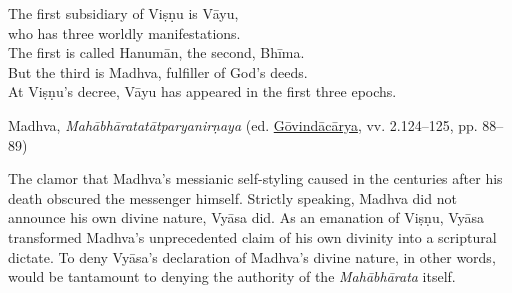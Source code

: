\begin{pullquote}


	
	      The first subsidiary of Viṣṇu is Vāyu,\\
	      who has three worldly manifestations.\\
	      The first is called Hanumān, the second, Bhīma.\\
	      But the third is Madhva, fulfiller of God’s deeds.\\
	      At Viṣṇu’s decree, Vāyu has appeared in the first three epochs.\footnotemark{}
	    \\


\medskip\hfill\begin{minipage}{0.9\textwidth}\small\hfill
Madhva, \emph{{Mahābhāratatātparyanirṇaya}} (ed. \hyperref[Madhva2009]{Gōvindācārya}, vv. 2.124–125, pp. 88–89)\end{minipage}\hspace{2em}
\end{pullquote}

The clamor that Madhva’s messianic self-styling caused in the centuries after his death obscured the messenger himself. Strictly speaking, Madhva did not announce his own divine nature, Vyāsa did. As an emanation of Viṣṇu, Vyāsa transformed Madhva’s unprecedented claim of his own divinity into a scriptural dictate. To deny Vyāsa’s declaration of Madhva’s divine nature, in other words, would be tantamount to denying the authority of the \emph{Mahābhārata} itself.


